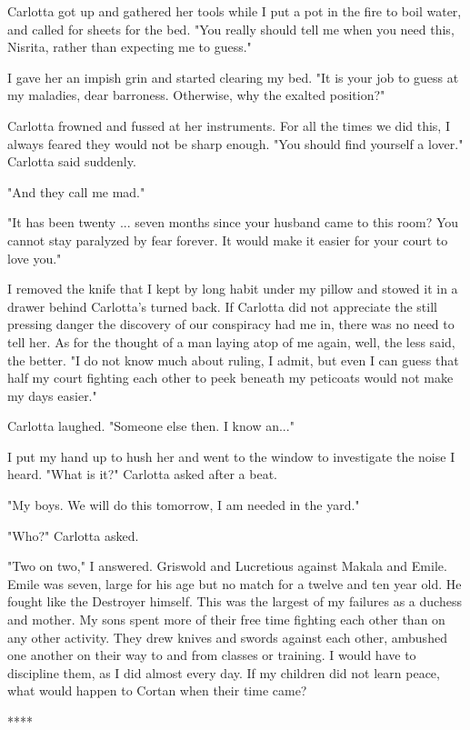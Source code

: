 \documentclass{article}
\begin{document}
Carlotta got up and gathered her tools while I put a pot in the fire to boil water, and called for sheets for the bed. "You really should tell me when you need this, Nisrita, rather than expecting me to guess."

I gave her an impish grin and started clearing my bed. "It is your job to guess at my maladies, dear barroness. Otherwise, why the exalted position?"

Carlotta frowned and fussed at her instruments. For all the times we did this, I always feared they would not be sharp enough. "You should find yourself a lover." Carlotta said suddenly.

"And they call me mad."

"It has been twenty ... seven months since your husband came to this room? You cannot stay paralyzed by fear forever. It would make it easier for your court to love you."

I removed the knife that I kept by long habit under my pillow and stowed it in a drawer behind Carlotta's turned back. If Carlotta did not appreciate the still pressing danger the discovery of our conspiracy had me in, there was no need to tell her. As for the thought of a man laying atop of me again, well, the less said, the better. "I do not know much about ruling, I admit, but even I can guess that half my court fighting each other to peek beneath my peticoats would not make my days easier."

Carlotta laughed. "Someone else then. I know an..."

I put my hand up to hush her and went to the window to investigate the noise I heard. "What is it?" Carlotta asked after a beat.

"My boys. We will do this tomorrow, I am needed in the yard."

"Who?" Carlotta asked.

"Two on two," I answered. Griswold and Lucretious against Makala and Emile. Emile was seven, large for his age but no match for a twelve and ten year old. He fought like the Destroyer himself. This was the largest of my failures as a duchess and mother. My sons spent more of their free time fighting each other than on any other activity. They drew knives and swords against each other, ambushed one another on their way to and from classes or training. I would have to discipline them, as I did almost every day. If my children did not learn peace, what would happen to Cortan when their time came?

\vspace{.5cm}
****
\end{document}
